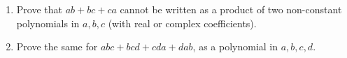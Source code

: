 \begin{enumerate}
\item[(a)] Prove that $ab+bc+ca$ cannot be written as a product of two non-constant polynomials in $a,b,c$ (with real or complex coefficients).
\item[(b)] Prove the same for $abc+bcd+cda+dab$, as a polynomial in $a,b,c,d$.
\end{enumerate}
